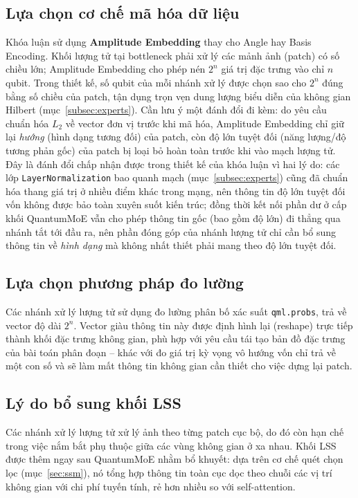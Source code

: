 \subsection{Lựa chọn cơ chế mã hóa dữ liệu}
Khóa luận sử dụng \textbf{Amplitude Embedding} thay cho Angle hay Basis Encoding. Khối lượng tử tại bottleneck phải xử lý các mảnh ảnh (patch) có số chiều lớn; Amplitude Embedding cho phép nén $2^{n}$ giá trị đặc trưng vào chỉ $n$ qubit. Trong thiết kế, số qubit của mỗi nhánh xử lý được chọn sao cho $2^{n}$ đúng bằng số chiều của patch, tận dụng trọn vẹn dung lượng biểu diễn của không gian Hilbert (mục~\ref{subsec:experts}). Cần lưu ý một đánh đổi đi kèm: do yêu cầu chuẩn hóa $L_2$ về vector đơn vị trước khi mã hóa, Amplitude Embedding chỉ giữ lại \emph{hướng} (hình dạng tương đối) của patch, còn độ lớn tuyệt đối (năng lượng/độ tương phản gốc) của patch bị loại bỏ hoàn toàn trước khi vào mạch lượng tử. Đây là đánh đổi chấp nhận được trong thiết kế của khóa luận vì hai lý do: các lớp \texttt{LayerNormalization} bao quanh mạch (mục~\ref{subsec:experts}) cũng đã chuẩn hóa thang giá trị ở nhiều điểm khác trong mạng, nên thông tin độ lớn tuyệt đối vốn không được bảo toàn xuyên suốt kiến trúc; đồng thời kết nối phần dư ở cấp khối QuantumMoE vẫn cho phép thông tin gốc (bao gồm độ lớn) đi thẳng qua nhánh tắt tới đầu ra, nên phần đóng góp của nhánh lượng tử chỉ cần bổ sung thông tin về \emph{hình dạng} mà không nhất thiết phải mang theo độ lớn tuyệt đối.

\subsection{Lựa chọn phương pháp đo lường}
Các nhánh xử lý lượng tử sử dụng đo lường phân bố xác suất \texttt{qml.probs}, trả về vector độ dài $2^{n}$. Vector giàu thông tin này được định hình lại (reshape) trực tiếp thành khối đặc trưng không gian, phù hợp với yêu cầu tái tạo bản đồ đặc trưng của bài toán phân đoạn -- khác với đo giá trị kỳ vọng vô hướng vốn chỉ trả về một con số và sẽ làm mất thông tin không gian cần thiết cho việc dựng lại patch.

\subsection{Lý do bổ sung khối LSS}
Các nhánh xử lý lượng tử xử lý ảnh theo từng patch cục bộ, do đó còn hạn chế trong việc nắm bắt phụ thuộc giữa các vùng không gian ở xa nhau. Khối LSS được thêm ngay sau QuantumMoE nhằm bổ khuyết: dựa trên cơ chế quét chọn lọc (mục~\ref{sec:ssm}), nó tổng hợp thông tin toàn cục dọc theo chuỗi các vị trí không gian với chi phí tuyến tính, rẻ hơn nhiều so với self-attention.

